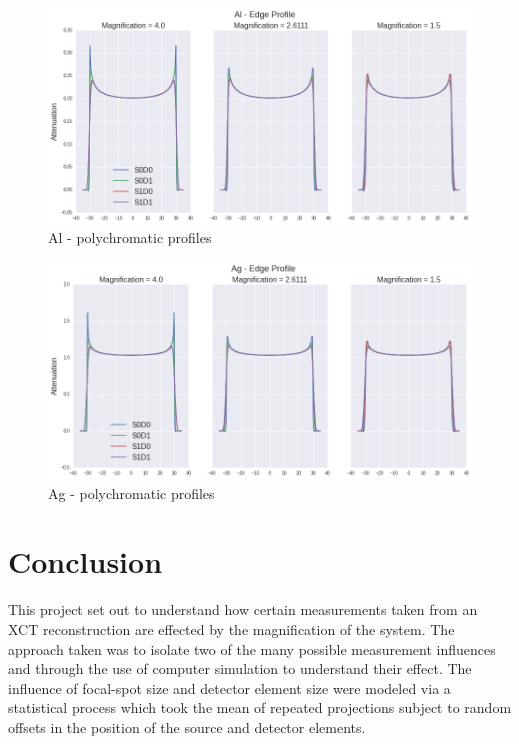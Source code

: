 \documentclass[
  twoside,
  11pt, a4paper,
  footinclude=true,
  headinclude=true,
  cleardoublepage=empty
]{scrbook}
\begin{document}
\begin{figure}[h!]
  \centering
    \includegraphics[width=\textwidth]{code/Polychromatic/Poly_Profiles_files/Poly_Profiles_3_1.png}
    \caption{Al - polychromatic profiles}
    \label{polyal}
\end{figure}

\begin{figure}[h!]
  \centering
    \includegraphics[width=\textwidth]{code/Polychromatic/Poly_Profiles_files/Poly_Profiles_4_1.png}
    \caption{Ag - polychromatic profiles}
    \label{polyag}
\end{figure}


\chapter{Conclusion}

This project set out to understand how certain measurements taken from an XCT reconstruction are effected by the magnification of the system. The approach taken was to isolate two of the many possible measurement influences and through the use of computer simulation to understand their effect. The influence of focal-spot size and detector element size were modeled via a statistical process which took the mean of repeated projections subject to random offsets in the position of the source and detector elements.
\end{document}
